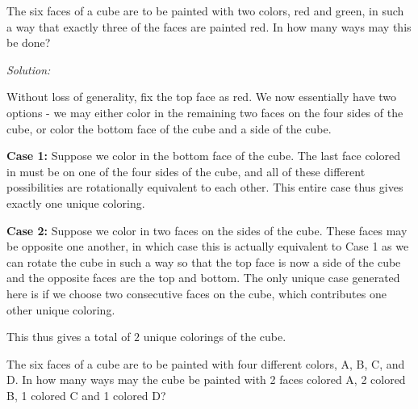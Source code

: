 \documentclass[12pt]{scrartcl}
\newenvironment{problem}[2][Problem]{\begin{trivlist}
\item[\hskip \labelsep {\bfseries #1}\hskip \labelsep {\bfseries #2.}]}{\end{trivlist}}
\newenvironment{solution}
    {\emph{Solution:}
    }
    {
    \qedhere
    }
\begin{document}
\thispagestyle{fancy}

\begin{problem}{1} 
The six faces of a cube are to be painted with two colors, red and green, in such a way that exactly three of the faces are painted red. In how many ways may this be done? 

\end{problem}

\begin{solution}
Without loss of generality, fix the top face as red. We now essentially have two options - we may either color in the remaining two faces on the four sides of the cube, or color the bottom face of the cube and a side of the cube. 

\textbf{Case 1:} Suppose we color in the bottom face of the cube. The last face colored in must be on one of the four sides of the cube, and all of these different possibilities are rotationally equivalent to each other. This entire case thus gives exactly one unique coloring. 

\textbf{Case 2:} Suppose we color in two faces on the sides of the cube. These faces may be opposite one another, in which case this is actually equivalent to Case 1 as we can rotate the cube in such a way so that the top face is now a side of the cube and the opposite faces are the top and bottom. The only unique case generated here is if we choose two consecutive faces on the cube, which contributes one other unique coloring. 

This thus gives a total of $\boxed{2}$ unique colorings of the cube. 

\end{solution}

\begin{problem}{2} 
The six faces of a cube are to be painted with four different colors, A, B, C, and D. In how many ways may the cube be painted with 2 faces colored A, 2 colored B, 1 colored C and 1 colored D? 

\end{problem}
\end{document}
